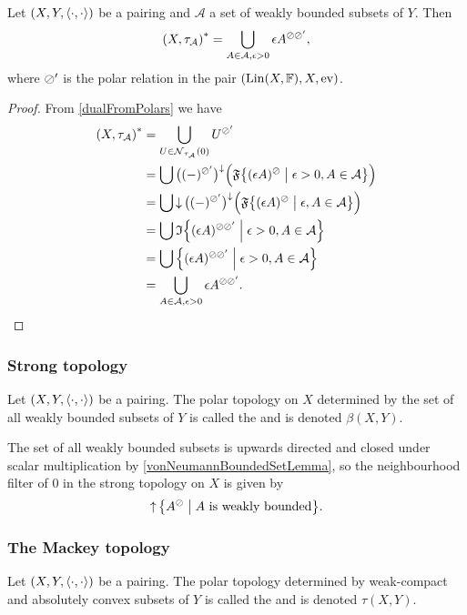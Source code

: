 \begin{lemma} \label{dualPolarTopology}
Let $\sSet{X,Y,\pair{\cdot,\cdot}}$ be a pairing and $\mathcal{A}$ a set of weakly bounded subsets of $Y$. Then
\[ \dual{\sSet{X, \polarTop{\mathcal{A}}}} = \bigcup_{A\in \mathcal{A}, \epsilon>0}\epsilon A^{\pol\pol'}, \]
where $\oslash'$ is the polar relation in the pair $\sSet{\Lin(X, \F), X, \evalMap}$.
\end{lemma}
\begin{proof}
From \ref{dualFromPolars} we have
\begin{align*}
\dual{\sSet{X, \polarTop{\mathcal{A}}}} &= \bigcup_{U\in \neighbourhood_{\polarTop{\mathcal{A}}}(0)}U^{\pol'} \\
&= \bigcup \big((-)^{\pol'}\big)^\imf\Big(\mathfrak{F}\setbuilder{(\epsilon A)^\pol}{\epsilon>0, A\in \mathcal{A}}\Big) \\
&= \bigcup \downset\big((-)^{\pol'}\big)^\imf\Big(\mathfrak{F}\setbuilder{(\epsilon A)^\pol}{\epsilon, A\in \mathcal{A}}\Big) \\
&= \bigcup \mathfrak{I}\setbuilder{(\epsilon A)^{\pol\pol'}}{\epsilon>0, A\in \mathcal{A}} \\
&= \bigcup \setbuilder{(\epsilon A)^{\pol\pol'}}{\epsilon>0, A\in \mathcal{A}} \\
&= \bigcup_{A\in \mathcal{A}, \epsilon>0}\epsilon A^{\pol\pol'}.
\end{align*}
\end{proof}

\subsubsection{Strong topology}
\begin{definition}
Let $\sSet{X,Y,\pair{\cdot,\cdot}}$ be a pairing. The polar topology on $X$ determined by the set of all weakly bounded subsets of $Y$ is called the  and is denoted $\beta(X,Y)$.
\end{definition}
The set of all weakly bounded subsets is upwards directed and closed under scalar multiplication by \ref{vonNeumannBoundedSetLemma}, so the neighbourhood filter of $0$ in the strong topology on $X$ is given by
\[ \upset\setbuilder{A^\pol}{\text{$A$ is weakly bounded}}. \]

\subsubsection{The Mackey topology}
\begin{definition}
Let $\sSet{X,Y,\pair{\cdot,\cdot}}$ be a pairing. The polar topology determined by weak-compact and absolutely convex subsets of $Y$ is called the  and is denoted $\tau(X, Y)$.
\end{definition}

